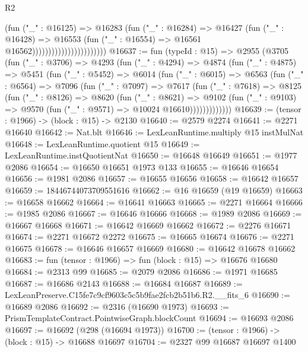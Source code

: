 \begin{lexlean}{R2}
\begin{coremodule}
                                          (fun ("_" : @16125) =>
                                          @16283
                                            (fun ("_" : @16284) =>
                                            @16427
                                              (fun ("_" : @16428) =>
                                              @16553
                                                (fun ("_" : @16554) =>
                                                @16561 @16562)))))))))))))))))))))))
@16637 := fun (typeId : @15) =>
  @2955
    (@3705
      (fun ("_" : @3706) =>
      @4293
        (fun ("_" : @4294) =>
        @4874
          (fun ("_" : @4875) =>
          @5451
            (fun ("_" : @5452) =>
            @6014
              (fun ("_" : @6015) =>
              @6563
                (fun ("_" : @6564) =>
                @7096
                  (fun ("_" : @7097) =>
                  @7617
                    (fun ("_" : @7618) =>
                    @8125
                      (fun ("_" : @8126) =>
                      @8620
                        (fun ("_" : @8621) =>
                        @9102
                          (fun ("_" : @9103) =>
                          @9570 (fun ("_" : @9571) => @10024 @16610)))))))))))))
@16639 := (tensor : @1966) -> (block : @15) -> @2130
@16640 := @2579 @2274
@16641 := @2271 @16640
@16642 := Nat.blt
@16646 := LexLeanRuntime.multiply @15 instMulNat
@16648 := LexLeanRuntime.quotient @15
@16649 := LexLeanRuntime.instQuotientNat
@16650 := @16648 @16649
@16651 := @1977 @2086
@16654 := @16650 @16651 @1973 @133
@16655 := @16646 @16654
@16656 := @1981 @2086
@16657 := @16655 @16656
@16658 := @16642 @16657
@16659 := 18446744073709551616
@16662 := @16 @16659 (@19 @16659)
@16663 := @16658 @16662
@16664 := @16641 @16663
@16665 := @2271 @16664
@16666 := @1985 @2086
@16667 := @16646 @16666
@16668 := @1989 @2086
@16669 := @16667 @16668
@16671 := @16642 @16669 @16662
@16672 := @2276 @16671
@16674 := @2271 @16672 @2272
@16675 := @16665 @16674
@16676 := @2271 @16675
@16678 := @16646 @16657 @16669
@16680 := @16642 @16678 @16662
@16683 := fun (tensor : @1966) => fun (block : @15) => @16676 @16680
@16684 := @2313 @99
@16685 := @2079 @2086
@16686 := @1971 @16685
@16687 := @16686 @2143
@16688 := @16684 @16687
@16689 := LexLeanPreserve.C15fe7c9cf9603c5c5b9fae2fcb2b51b6.R2.__fits_6
@16690 := @16689 @2086
@16692 := @2316 (@16690 @1973)
@16693 := PrismTemplateContract.PointwiseGraph.blockCount
@16694 := @16693 @2086
@16697 := @16692 (@298 (@16694 @1973))
@16700 := (tensor : @1966) -> (block : @15) -> @16688 @16697
@16704 := @2327 @99 @16687 @16697 @1400

\end{coremodule}
\end{lexlean}
